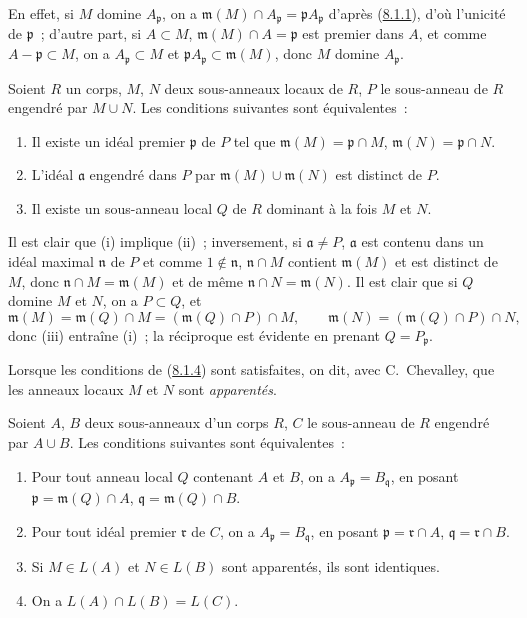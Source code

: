 En effet, si $M$ domine $A_\mathfrak p$, on a
$\mathfrak m(M)\cap A_\mathfrak p=\mathfrak p A_\mathfrak p$ d'après
(\hyperref[I.8.1.1-fr]{8.1.1}), d'où l'unicité de $\mathfrak p$~; d'autre
part, si $A\subset M$, $\mathfrak m(M)\cap A=\mathfrak p$ est premier dans
$A$, et comme $A-\mathfrak p\subset M$, on a $A_\mathfrak p\subset M$ et
$\mathfrak p A_\mathfrak p\subset\mathfrak m(M)$, donc $M$ domine
$A_\mathfrak p$.

\begin{lemma}[8.1.4]
\label{I.8.1.4-fr}
Soient $R$ un corps, $M$, $N$ deux sous-anneaux locaux de $R$, $P$ le
sous-anneau de $R$ engendré par $M\cup N$. Les conditions suivantes sont
équivalentes~:
\begin{enumerate}
  \item[(i)] Il existe un idéal premier $\mathfrak p$ de $P$ tel que
    $\mathfrak m(M)=\mathfrak p\cap M$,
    $\mathfrak m(N)=\mathfrak p\cap N$.
  \item[(ii)] L'idéal $\mathfrak a$ engendré dans $P$ par
    $\mathfrak m(M)\cup\mathfrak m(N)$ est distinct de $P$.
  \item[(iii)] Il existe un sous-anneau local $Q$ de $R$ dominant à la fois
    $M$ et $N$.
\end{enumerate}
\end{lemma}

Il est clair que (i) implique (ii)~; inversement, si $\mathfrak a\ne P$,
$\mathfrak a$ est contenu dans un idéal maximal $\mathfrak n$ de $P$ et comme
$1\notin\mathfrak n$, $\mathfrak n\cap M$ contient $\mathfrak m(M)$ et est
distinct de $M$, donc $\mathfrak n\cap M=\mathfrak m(M)$ et de même
$\mathfrak n\cap N=\mathfrak m(N)$. Il est clair que si $Q$ domine $M$ et
$N$, on a $P\subset Q$, et
\[
  \mathfrak m(M)=\mathfrak m(Q)\cap M
  =(\mathfrak m(Q)\cap P)\cap M,\qquad
  \mathfrak m(N)=(\mathfrak m(Q)\cap P)\cap N,
\]
donc (iii) entraîne (i)~; la réciproque est évidente en prenant
$Q=P_\mathfrak p$.

Lorsque les conditions de (\hyperref[I.8.1.4-fr]{8.1.4}) sont satisfaites,
on dit, avec C.~Chevalley, que les anneaux locaux $M$ et $N$ sont
\emph{apparentés}.

\begin{proposition}[8.1.5]
\label{I.8.1.5-fr}
Soient $A$, $B$ deux sous-anneaux d'un corps $R$, $C$ le sous-anneau de $R$
engendré par $A\cup B$. Les conditions suivantes sont équivalentes~:
\begin{enumerate}
  \item[(i)] Pour tout anneau local $Q$ contenant $A$ et $B$, on a
    $A_\mathfrak p=B_\mathfrak q$, en posant
    $\mathfrak p=\mathfrak m(Q)\cap A$,
    $\mathfrak q=\mathfrak m(Q)\cap B$.
  \item[(ii)] Pour tout idéal premier $\mathfrak r$ de $C$, on a
    $A_\mathfrak p=B_\mathfrak q$, en posant
    $\mathfrak p=\mathfrak r\cap A$, $\mathfrak q=\mathfrak r\cap B$.
  \item[(iii)] Si $M\in L(A)$ et $N\in L(B)$ sont apparentés, ils sont
    identiques.
  \item[(iv)] On a $L(A)\cap L(B)=L(C)$.
\end{enumerate}
\end{proposition}


